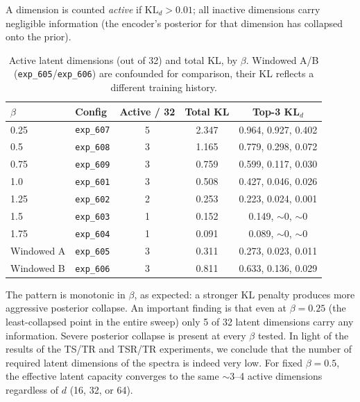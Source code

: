 
A dimension is counted \emph{active} if $\mathrm{KL}_d > 0.01$; all inactive dimensions carry negligible information (the encoder's posterior for that dimension has collapsed onto the prior).

\begin{table}[H]
\centering
\small
\begin{tabular*}{\textwidth}{@{\extracolsep{\fill}}llccc}
\toprule
$\beta$ & Config & Active / 32 & Total KL & Top-3 KL$_d$ \\
\midrule
0.25 & \texttt{exp\_607} & 5 & 2.347 & 0.964, 0.927, 0.402 \\
0.5 & \texttt{exp\_608} & 3 & 1.165 & 0.779, 0.298, 0.072 \\
0.75 & \texttt{exp\_609} & 3 & 0.759 & 0.599, 0.117, 0.030 \\
1.0 & \texttt{exp\_601} & 3 & 0.508 & 0.427, 0.046, 0.026 \\
1.25 & \texttt{exp\_602} & 2 & 0.253 & 0.223, 0.024, 0.001 \\
1.5 & \texttt{exp\_603} & 1 & 0.152 & 0.149, $\sim$0, $\sim$0 \\
1.75 & \texttt{exp\_604} & 1 & 0.091 & 0.089, $\sim$0, $\sim$0 \\
Windowed A & \texttt{exp\_605} & 3 & 0.311 & 0.273, 0.023, 0.011 \\
Windowed B & \texttt{exp\_606} & 3 & 0.811 & 0.633, 0.136, 0.029 \\
\bottomrule
\end{tabular*}
\caption{\small Active latent dimensions (out of 32) and total KL, by $\beta$. Windowed A/B (\texttt{exp\_605}/\texttt{exp\_606}) are confounded for comparison, their KL reflects a different training history.}\label{tab:beta_kl_dims}
\end{table}

The pattern is monotonic in $\beta$, as expected: a stronger KL penalty produces more aggressive posterior collapse. An important finding is that even at $\beta=0.25$ (the least-collapsed point in the entire sweep) only 5 of 32 latent dimensions carry any information. Severe posterior collapse is present at every $\beta$ tested. In light of the results of the TS/TR and TSR/TR experiments, we conclude that the number of required latent dimensions of the spectra is indeed very low. For fixed $\beta = 0.5$, the effective latent capacity converges to the same $\sim$3--4 active dimensions regardless of $d$ (16, 32, or 64).

